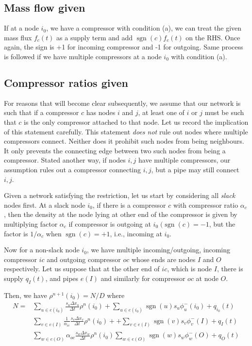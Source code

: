 \documentclass{amsart}
\DeclareMathOperator{\sgn}{sgn}
\begin{document}
\subsection{Mass flow given}

If at a node $i_0$, we have a compressor with condition (a), we can treat the given mass flux $f_c(t)$ as a supply term and add $\sgn(c)f_c(t)$ on the RHS. Once again, the sign is +1 for incoming compressor and -1 for outgoing.
Same process is followed if we have multiple compressors at a node $i_0$ with condition (a).

\subsection{Compressor ratios given}

For reasons that will become clear subsequently, we assume that our network is such that if a compressor $c$ has nodes $i$ and $j$, at least one of $i$ or $j$  must be such that $c$ is the only compressor attached to that node. Let us record the implication of this statement  carefully.
This statement \emph{does not} rule out nodes where multiple compressors connect. Neither does it prohibit  such nodes from being neighbours. It only prevents the connecting edge between two such nodes from being a compressor. Stated another way, if nodes $i, j$ have multiple compressors, our assumption rules out a compressor connecting $i,j$, but a pipe may still connect $i, j$. 

Given a network satisfying the restriction, let us start by considering all \emph{slack} nodes first.
At a slack node $i_0$, if there is a compressor $c$ with compressor ratio $\alpha_c$, then the density at the node lying at other end of  the compressor is given by multiplying factor $\alpha_c$ if compressor is outgoing at $i_0 \; (\sgn(c) = -1$, but the factor is $1/\alpha_c$ when $\sgn(c) = +1$, i.e., incoming at $i_0$.



Now for a non-slack node $i_0$, we have multiple incoming/outgoing, incoming compressor $ic$ and outgoing compressor $oc$ whose ends are nodes $I$ and $O$ respectively.
Let us suppose that at the other end of $ic$, which is node $I$, there is supply $q_{I}(t)$, and pipes $e(I)$ and similarly for compressor $oc$ at node $O$.

Then, we have $\rho^{n+1}(i_0) = N/D$ 
where
\begin{align*}
N = & \sum_{u \in e(i_0)}\frac{s_u \Delta x_u}{\Delta t}\rho^n(i_0) +  \sum_{u \in e(i_0) }\sgn(u) s_u \phi_{u}^-(i_0) + q_{i_0}(t) \\ 
& \sum_{v \in e(I)}\frac{1}{\alpha_{ic}} \frac{s_{v} \Delta x_{v}}{\Delta t} \rho^n(i_0) + 
+ \sum_{v \in e(I)}\sgn(v) s_{v} \phi_{v}^-(I) + q_I(t) \\
& \sum_{w \in e(O)}\alpha_{oc} \frac{s_{w} \Delta x_{w}}{\Delta t} \rho^n(i_0) 
\sum_{w \in e(O)}\sgn(w) s_{w} \phi_{w}^-(O) +  q_{O}(t)   \\
\end{align*}
\end{document}
